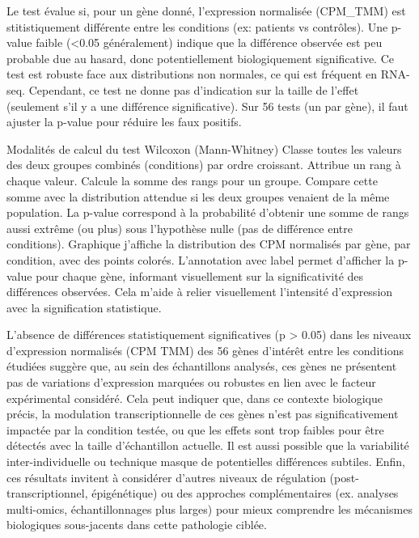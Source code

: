     Le test évalue si, pour un gène donné, l’expression normalisée (CPM\_TMM) est stitistiquement différente entre les conditions (ex: patients vs contrôles).
    Une p-value faible (<0.05 généralement) indique que la différence observée est peu probable due au hasard, donc potentiellement biologiquement significative.
    Ce test est robuste face aux distributions non normales, ce qui est fréquent en RNA-seq.
    Cependant, ce test ne donne pas d’indication sur la taille de l’effet (seulement s’il y a une différence significative).
    Sur 56 tests (un par gène), il faut ajuster la p-value pour réduire les faux positifs.
    
Modalités de calcul du test Wilcoxon (Mann-Whitney)
    Classe toutes les valeurs des deux groupes combinés (conditions) par ordre croissant.
    Attribue un rang à chaque valeur.
    Calcule la somme des rangs pour un groupe.
    Compare cette somme avec la distribution attendue si les deux groupes venaient de la même population.
    La p-value correspond à la probabilité d’obtenir une somme de rangs aussi extrême (ou plus) sous l’hypothèse nulle (pas de différence entre conditions).
Graphique
 j'affiche la distribution des CPM normalisés par gène, par condition, avec des points colorés.
    L’annotation avec label permet d’afficher la p-value pour chaque gène, informant visuellement sur la significativité des différences observées.
    Cela m’aide à relier visuellement l’intensité d’expression avec la signification statistique.
    
L’absence de différences statistiquement significatives (p > 0.05) dans les niveaux d’expression normalisés (CPM TMM) des 56 gènes d’intérêt entre les conditions étudiées suggère que, au sein des échantillons analysés, ces gènes ne présentent pas de variations d’expression marquées ou robustes en lien avec le facteur expérimental considéré. Cela peut indiquer que, dans ce contexte biologique précis, la modulation transcriptionnelle de ces gènes n’est pas significativement impactée par la condition testée, ou que les effets sont trop faibles pour être détectés avec la taille d’échantillon actuelle. Il est aussi possible que la variabilité inter-individuelle ou technique masque de potentielles différences subtiles. Enfin, ces résultats invitent à considérer d’autres niveaux de régulation (post-transcriptionnel, épigénétique) ou des approches complémentaires (ex. analyses multi-omics, échantillonnages plus larges) pour mieux comprendre les mécanismes biologiques sous-jacents dans cette pathologie ciblée.

   
    

